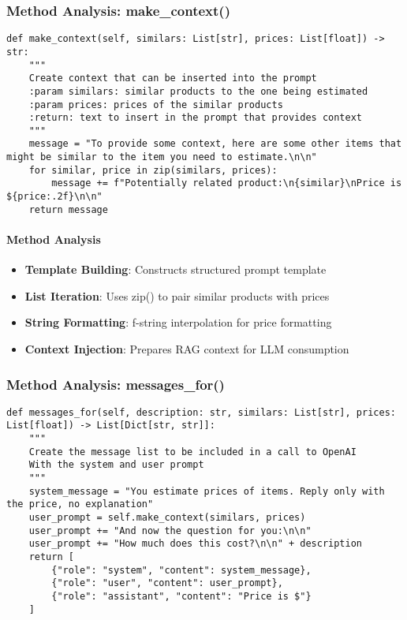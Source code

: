 \subsubsection{Method Analysis: make\_context()}

\begin{lstlisting}[caption=Context Generation Method]
def make_context(self, similars: List[str], prices: List[float]) -> str:
    """
    Create context that can be inserted into the prompt
    :param similars: similar products to the one being estimated
    :param prices: prices of the similar products
    :return: text to insert in the prompt that provides context
    """
    message = "To provide some context, here are some other items that might be similar to the item you need to estimate.\n\n"
    for similar, price in zip(similars, prices):
        message += f"Potentially related product:\n{similar}\nPrice is ${price:.2f}\n\n"
    return message
\end{lstlisting}

\paragraph{Method Analysis}
\begin{itemize}
\item \textbf{Template Building}: Constructs structured prompt template
\item \textbf{List Iteration}: Uses zip() to pair similar products with prices
\item \textbf{String Formatting}: f-string interpolation for price formatting
\item \textbf{Context Injection}: Prepares RAG context for LLM consumption
\end{itemize}

\subsubsection{Method Analysis: messages\_for()}

\begin{lstlisting}[caption=OpenAI Message Construction]
def messages_for(self, description: str, similars: List[str], prices: List[float]) -> List[Dict[str, str]]:
    """
    Create the message list to be included in a call to OpenAI
    With the system and user prompt
    """
    system_message = "You estimate prices of items. Reply only with the price, no explanation"
    user_prompt = self.make_context(similars, prices)
    user_prompt += "And now the question for you:\n\n"
    user_prompt += "How much does this cost?\n\n" + description
    return [
        {"role": "system", "content": system_message},
        {"role": "user", "content": user_prompt},
        {"role": "assistant", "content": "Price is $"}
    ]
\end{lstlisting}

